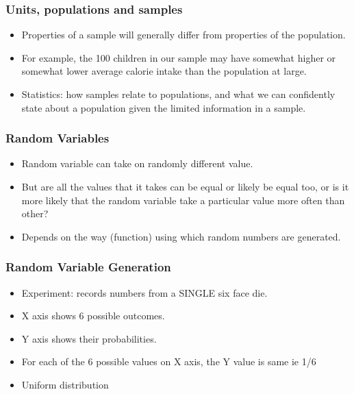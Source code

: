 \begin{frame}
\frametitle{Units, populations and samples}


\begin{itemize}
\item Properties of a sample will generally differ from properties of the
population.  
\item For example, the 100 children in our sample may have
somewhat higher or somewhat lower average calorie intake than the
population at large. 
\item 
Statistics: how samples relate to
populations, and what we can confidently state about a population
given the limited information in a sample.

\end{itemize}

\end{frame}

\begin{frame}\frametitle{Random Variables}
\begin{itemize}
\item  Random variable can take on randomly different
value. 
\item But are all the values that it takes can be equal or likely be equal
too, or is it more likely that the random variable take a particular value
more often than other?
\item Depends on the way (function) using which random numbers are generated.
\end{itemize}
\end{frame}

\begin{frame}\frametitle{Random Variable Generation}
\begin{itemize}
\item  Experiment: records numbers from a SINGLE six face die.
\item X axis shows 6 possible outcomes.
\item Y axis shows their probabilities.
\item For each of the 6 possible values on X axis, the Y value is same ie 1/6
\item Uniform distribution
\end{itemize}
\end{frame}

